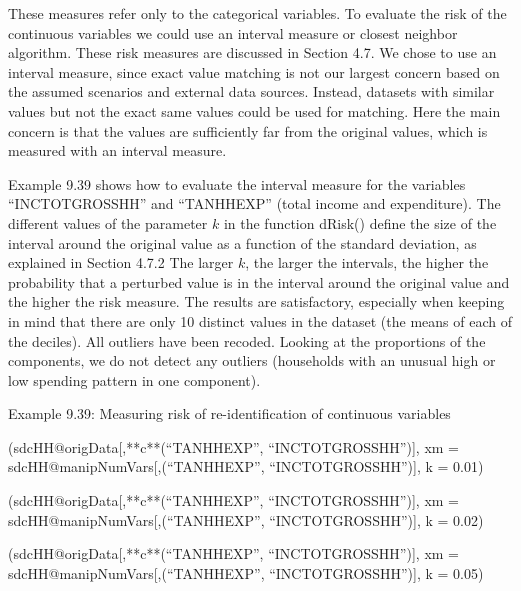\documentclass[letterpaper,10pt,english]{sphinxmanual}
\begin{document}
These measures refer only to the categorical variables. To evaluate the
risk of the continuous variables we could use an interval measure or
closest neighbor algorithm. These risk measures are discussed in Section
4.7. We chose to use an interval measure, since exact value matching is
not our largest concern based on the assumed scenarios and external data
sources. Instead, datasets with similar values but not the exact same
values could be used for matching. Here the main concern is that the
values are sufficiently far from the original values, which is measured
with an interval measure.

Example 9.39 shows how to evaluate the interval measure for the
variables “INCTOTGROSSHH” and “TANHHEXP” (total income and expenditure).
The different values of the parameter \(k\) in the function dRisk()
define the size of the interval around the original value as a function
of the standard deviation, as explained in Section 4.7.2 The larger
\(k\), the larger the intervals, the higher the probability that a
perturbed value is in the interval around the original value and the
higher the risk measure. The results are satisfactory, especially when
keeping in mind that there are only 10 distinct values in the dataset
(the means of each of the deciles). All outliers have been recoded.
Looking at the proportions of the components, we do not detect any
outliers (households with an unusual high or low spending pattern in one
component).

Example 9.39: Measuring risk of re-identification of continuous
variables

\begin{DUlineblock}{0em}
\item[] 
\item[] (sdcHH@origData{[},**c**(“TANHHEXP”, “INCTOTGROSSHH”){]}, xm
= sdcHH@manipNumVars{[},(“TANHHEXP”, “INCTOTGROSSHH”){]}, k =
0.01)
\end{DUlineblock}


(sdcHH@origData{[},**c**(“TANHHEXP”, “INCTOTGROSSHH”){]}, xm =
sdcHH@manipNumVars{[},(“TANHHEXP”, “INCTOTGROSSHH”){]}, k = 0.02)


(sdcHH@origData{[},**c**(“TANHHEXP”, “INCTOTGROSSHH”){]}, xm =
sdcHH@manipNumVars{[},(“TANHHEXP”, “INCTOTGROSSHH”){]}, k = 0.05)
\end{document}
